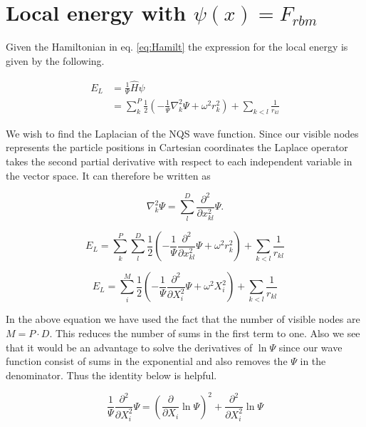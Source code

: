 \section{Local energy with $\psi(x) = F_{rbm}$}

Given the Hamiltonian in eq. \ref{eq:Hamilt} the expression for the local energy is given by the following.

\begin{align*}
E_L &= \frac{1}{\Psi}\hat{H}\psi \\
&= \sum_{k}^{P} \frac{1}{2} \left( -\frac{1}{\Psi} \nabla_k^2 \Psi +  \omega^2 r_k^2 \right) + \sum_{k < l} \frac{1}{r_{kl}}
\end{align*}

We wish to find the Laplacian of the NQS wave function. Since our visible nodes represents the particle positions in Cartesian coordinates the Laplace operator takes the second partial derivative with respect to each independent variable in the vector space. It can therefore be written as  

\begin{equation*}
\nabla_k^2 \Psi = \sum_{l}^{D} \frac{\partial^2}{\partial x_{kl}^2} \Psi.
\end{equation*}

\begin{equation*}
E_L = \sum_{k}^{P} \sum_{l}^{D} \frac{1}{2} \left( -\frac{1}{\Psi} \frac{\partial^2}{\partial x_{kl}^2} \Psi +  \omega^2 r_k^2 \right) + \sum_{k < l} \frac{1}{r_{kl}}
\end{equation*}

\begin{equation*}
E_L = \sum_{i}^{M} \frac{1}{2} \left( -\frac{1}{\Psi} \frac{\partial^2}{\partial X_{i}^2} \Psi +  \omega^2 X_i^2 \right) +  \sum_{k < l} \frac{1}{r_{kl}}
\end{equation*}

In the above equation we have used the fact that the number of visible nodes are $M = P \cdot D$. This reduces the number of sums in the first term to one. Also we see that it would be an advantage to solve the derivatives of $\ln \Psi$ since our wave function consist of sums in the exponential and also removes the $\Psi$ in the denominator. Thus the identity below is helpful. 

\begin{equation*}
\frac{1}{\Psi} \frac{\partial^2}{\partial X_{i}^2} \Psi = \left( \frac{\partial}{\partial X_{i}} \ln \Psi \right)^2 + \frac{\partial^2}{\partial X_{i}^2} \ln \Psi
\end{equation*}


